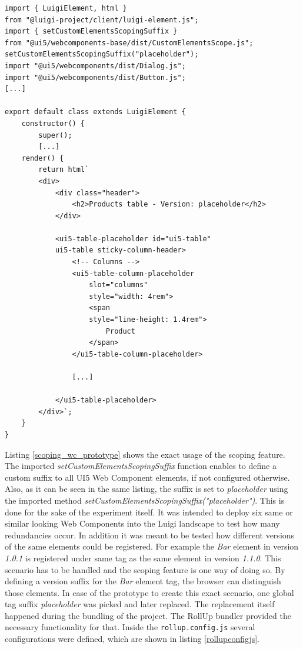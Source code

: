 \begin{lstlisting}[caption=Scoping feature used in the prototype, label=scoping_wc_prototype]
import { LuigiElement, html } 
from "@luigi-project/client/luigi-element.js";
import { setCustomElementsScopingSuffix } 
from "@ui5/webcomponents-base/dist/CustomElementsScope.js";
setCustomElementsScopingSuffix("placeholder");
import "@ui5/webcomponents/dist/Dialog.js";
import "@ui5/webcomponents/dist/Button.js";
[...]

export default class extends LuigiElement {
	constructor() {
		super();
		[...]
	render() {
		return html`
		<div>
			<div class="header">
				<h2>Products table - Version: placeholder</h2>
			</div>
			
			<ui5-table-placeholder id="ui5-table" 
			ui5-table sticky-column-header>
				<!-- Columns -->
				<ui5-table-column-placeholder 
					slot="columns" 
					style="width: 4rem">
					<span 
					style="line-height: 1.4rem">
						Product
					</span>
				</ui5-table-column-placeholder>
				
				[...]
				
			</ui5-table-placeholder>
		</div>`;
	}
}
\end{lstlisting}

Listing \ref{scoping_wc_prototype} shows the exact usage of the scoping feature. 
The imported \textit{setCustomElementsScopingSuffix} function enables to define a custom suffix to all UI5 Web Component elements, if not configured otherwise. Also, as it can be seen in the same listing, the suffix is set to \textit{placeholder} using the imported method 
\textit{setCustomElementsScopingSuffix("placeholder")}.
This is done for the sake of the experiment itself. It was intended to deploy six same or similar looking Web Components into the Luigi landscape to test how many redundancies occur. In addition it was meant to be tested how different versions of the same elements could be registered. For example the \textit{Bar} element in version \textit{1.0.1} is registered under same tag as the same element in version \textit{1.1.0}. This scenario has to be handled and the scoping feature is one way of doing so.
By defining a version suffix for the \textit{Bar} element tag, the browser can distinguish those elements.
In case of the prototype to create this exact scenario, one global tag suffix \textit{placeholder} was picked and later replaced. The replacement itself happened during the bundling of the project. The RollUp bundler provided the necessary functionality for that.
Inside the \texttt{rollup.config.js} several configurations were defined, which are shown in listing \ref{rollupconfigjs}.

